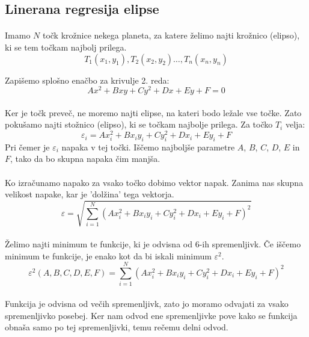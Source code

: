 \documentclass[a4paper, 12pt]{article}
\begin{document}
	\subsection*{Linerana regresija elipse}
	\paragraph{}
	Imamo $N$ točk krožnice nekega planeta, za katere želimo najti krožnico (elipso), ki se tem točkam najbolj prilega.
	$$T_1(x_1, y_1), T_2(x_2, y_2) \ldots, T_n(x_n, y_n)$$

	Zapišemo splošno enačbo za krivulje 2. reda:
	$$Ax^2 + Bxy + Cy^2 + Dx + Ey + F = 0$$

	\paragraph{}
	Ker je točk preveč, ne moremo najti elipse, na kateri bodo ležale vse točke. Zato pokušamo najti stožnico (elipso), ki se točkam najbolje prilega. Za točko $T_i$ velja:
	$$\varepsilon_i = Ax_i^2 + Bx_iy_i + Cy_i^2 + Dx_i + Ey_i + F$$
	Pri čemer je $\varepsilon_i$ napaka v tej točki. Iščemo najboljše parametre $A$, $B$, $C$, $D$, $E$ in $F$, tako da bo skupna napaka čim manjša.

	\paragraph{}
	Ko izračunamo napako za vsako točko dobimo vektor napak. Zanima nas skupna velikost napake, kar je 'dolžina' tega vektorja.
	$$\varepsilon = \sqrt{\sum_{i=1}^{N} (Ax_i^2 + Bx_iy_i + Cy_i^2 + Dx_i + Ey_i + F)^2}$$

	\paragraph{}
	Želimo najti minimum te funkcije, ki je odvisna od 6-ih spremenljivk. Če iščemo minimum te funkcije, je enako kot da bi iskali minimum $\varepsilon^{2}$.
	$$\varepsilon^2(A, B, C, D, E, F) = \sum_{i=1}^{N} (Ax_i^2 + Bx_iy_i + Cy_i^2 + Dx_i + Ey_i + F)^2$$

	\paragraph{}
	Funkcija je odvisna od večih spremenljivk, zato jo moramo odvajati za vsako spremenljivko posebej. Ker nam odvod ene spremenljivke pove kako se funkcija obnaša samo po tej spremenljivki, temu rečemu delni odvod.
\end{document}
